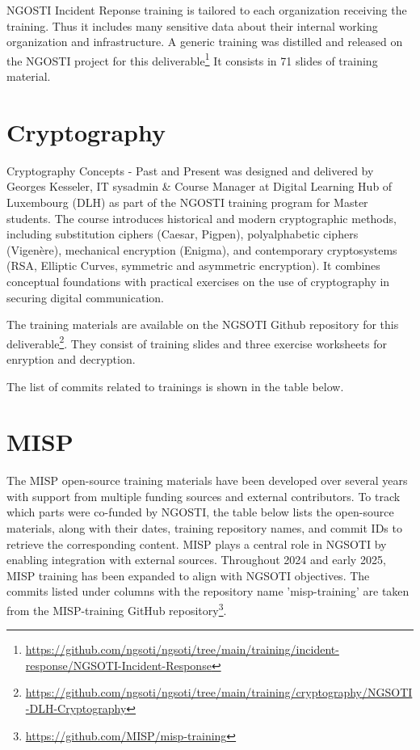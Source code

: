 \documentclass[10pt,a4paper]{report}
\begin{document}
NGOSTI Incident Reponse training is tailored to each organization receiving the
training. Thus it includes many sensitive data about their internal working
organization and infrastructure.
A generic training was distilled and released on the NGOSTI project for this
deliverable\footnote{\url{https://github.com/ngsoti/ngsoti/tree/main/training/incident-response/NGSOTI-Incident-Response}}
It consists in 71 slides of training material.

\section{Cryptography}

Cryptography Concepts - Past and Present was designed and delivered by Georges Kesseler, IT sysadmin \& Course Manager at Digital Learning Hub of Luxembourg (DLH) as part of the NGOSTI training program for Master students. The course introduces historical and modern cryptographic methods, including substitution ciphers (Caesar, Pigpen), polyalphabetic ciphers (Vigenère), mechanical encryption (Enigma), and contemporary cryptosystems (RSA, Elliptic Curves, symmetric and asymmetric encryption). It combines conceptual foundations with practical exercises on the use of cryptography in securing digital communication.

The training materials are available on the NGSOTI Github repository for this deliverable\footnote{\url{https://github.com/ngsoti/ngsoti/tree/main/training/cryptography/NGSOTI-DLH-Cryptography}}. They consist of training slides and three exercise worksheets for enryption and decryption.



The list of commits related to trainings is shown in the table below.

\section{MISP}
The MISP open-source training materials have been developed over several years
with support from multiple funding sources and external contributors. To track
which parts were co-funded by NGOSTI, the table below lists the open-source
materials, along with their dates, training repository names, and commit IDs
to retrieve the corresponding content.
MISP plays a central role in NGSOTI by enabling integration with external
sources. Throughout 2024 and early 2025, MISP training has been expanded to
align with NGSOTI objectives. The commits listed under columns with the
repository name 'misp-training' are taken from the MISP-training GitHub
repository\footnote{\url{https://github.com/MISP/misp-training}}.
\end{document}
